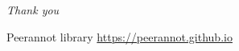 \begin{frame}{}{}
    \centering \Huge{
    \emph{Thank you}}

    \vspace{1cm}
\begin{block}{Peerannot library}
    \centering
    \large{
    \url{https://peerannot.github.io}}
\end{block}
\end{frame}
